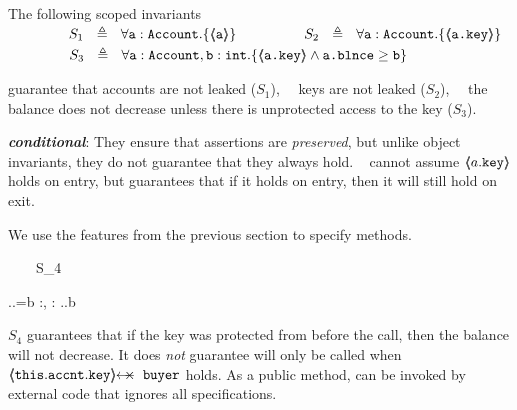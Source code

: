 \begin{example}
\label{s:bankSpecEx}
The following scoped invariants\\
$\strut \SPSP\ \ \   S_1\ \  \triangleq \ \ \TwoStatesN {\prg{a}:\prg{Account}}  {\inside{\prg{a}}} $ 
\hspace{1.1cm}
$\strut  \SPSP\ \ \   S_2\ \  \triangleq \ \ \TwoStatesN  {\prg{a}:\prg{Account}}  {\inside{\prg{a.key}}} $ 
\\
$\strut  \SPSP\ \ \   S_3\ \  \triangleq \ \ \TwoStatesN{ \prg{a}:\prg{Account},\prg{b}:\prg{int} } {\inside{\prg{a.key}} \wedge \prg{a.\balance} \geq \prg{b} } $ 

\noindent
 guarantee that   accounts are not leaked  ($S_1$), \ \ keys are not leaked  ($S_2$), \ \ the balance does not decrease unless there is unprotected access to the key  ($S_3$).
%
\end{example} 


 
 \vspace{.05cm}

 
\noindent
{\textbf{ 
 \emph{conditional}}:}  They ensure that assertions are \emph{preserved}, but unlike object invariants, they do not guarantee that they always hold.
\ \Eg   {} cannot assume $\langle\!\!\langle a.\mbox{\normalfont{\texttt{key}}} \rangle\!\!\rangle$ holds on entry, but   guarantees that if it holds on entry, then  it will still hold on exit.

 
 \begin{example}
 We   use the features from the previous section to specify methods. 

{\sprepost
		{\strut \ \ \ \ S_4} 
		{    {} \wedge {}.\prg{\myAccount}.\prg{\balance}=b
		 }
		{} {} {:, : }
		{ 
		  .\prg{\myAccount}.\prg{\balance}\geq b
		 }
}

\noindent
$S_4$  guarantees that if the %
key was protected from  before the call, then the balance will not decrease. %
 It does \emph{not} guarantee  will only be called when $\protectedFrom{\prg{this}.\prg{\myAccount}.\prg{key}} {\prg{buyer}}$ holds. 
As a  public method,    can be invoked by external code that ignores all specifications.
\end{example}

